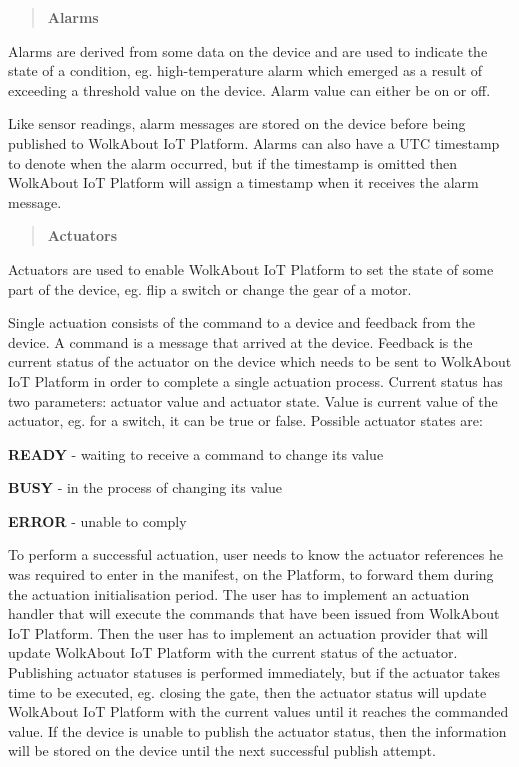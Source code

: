 \label{_alarms}%
 \begin{quote}
{\bfseries Alarms} \end{quote}
Alarms are derived from some data on the device and are used to indicate the state of a condition, eg. high-\/temperature alarm which emerged as a result of exceeding a threshold value on the device. Alarm value can either be on or off.

Like sensor readings, alarm messages are stored on the device before being published to Wolk\+About IoT Platform. Alarms can also have a U\+TC timestamp to denote when the alarm occurred, but if the timestamp is omitted then Wolk\+About IoT Platform will assign a timestamp when it receives the alarm message.

\label{_actuators}%
 \begin{quote}
{\bfseries Actuators} \end{quote}
Actuators are used to enable Wolk\+About IoT Platform to set the state of some part of the device, eg. flip a switch or change the gear of a motor.

Single actuation consists of the command to a device and feedback from the device. A command is a message that arrived at the device. Feedback is the current status of the actuator on the device which needs to be sent to Wolk\+About IoT Platform in order to complete a single actuation process. Current status has two parameters\+: actuator value and actuator state. Value is current value of the actuator, eg. for a switch, it can be true or false. Possible actuator states are\+:


\begin{DoxyItemize}
\item {\bfseries R\+E\+A\+DY} -\/ waiting to receive a command to change its value
\item {\bfseries B\+U\+SY} -\/ in the process of changing its value
\item {\bfseries E\+R\+R\+OR} -\/ unable to comply
\end{DoxyItemize}

To perform a successful actuation, user needs to know the actuator references he was required to enter in the manifest, on the Platform, to forward them during the actuation initialisation period. The user has to implement an actuation handler that will execute the commands that have been issued from Wolk\+About IoT Platform. Then the user has to implement an actuation provider that will update Wolk\+About IoT Platform with the current status of the actuator. Publishing actuator statuses is performed immediately, but if the actuator takes time to be executed, eg. closing the gate, then the actuator status will update Wolk\+About IoT Platform with the current values until it reaches the commanded value. If the device is unable to publish the actuator status, then the information will be stored on the device until the next successful publish attempt.


